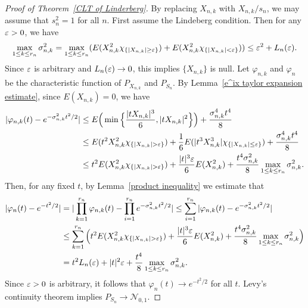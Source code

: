 \begin{proof}[Proof of Theorem~\ref{CLT of Linderberg}]
By replacing $X_{n,k}$ with $X_{n,k}/s_n$, we may assume that $s_n^2=1$ for all $n$. First assume the Lindeberg condition. Then for any $\varepsilon>0$, we have
\begin{equation*}
\begin{aligned}
\max_{1\leq k\leq r_n}\sigma_{n,k}^2=\max_{1\leq k\leq r_n}(E(X_{n,k}^2\chi_{\{|X_{n,k}|\geq\varepsilon\}})+E(X_{n,k}^2\chi_{\{|X_{n,k}|<\varepsilon\}}))\leq\varepsilon^2+L_n(\varepsilon).
\end{aligned}
\end{equation*}
Since $\varepsilon$ is arbitrary and $L_n(\varepsilon)\to 0$, this implies $\{X_{n,k}\}$ is null. Let $\varphi_{n,k}$ and $\varphi_n$ be the characteristic function of $P_{X_{n,k}}$ and $P_{S_n}$. By Lemma~\ref{e^ix taylor expansion estimate}, since $E(X_{n,k})=0$, we have
\begin{equation*}
\begin{aligned}
|\varphi_{n,k}(t)-e^{-\sigma_{n,k}^2t^2/2}|&\leq E\Big(\min\Big\{\frac{|tX_{n,k}|^3}{6},|tX_{n,k}|^2\Big\}\Big)+\frac{\sigma_{n,k}^4t^4}{8}\\
&\leq E(t^2X_{n,k}^2\chi_{\{|X_{n,k}|>\eps\}})+\frac{1}{6}E(|t^3X_{n,k}^3|\chi_{\{|X_{n,k}|\leq\eps\}})+\frac{\sigma_{n,k}^4t^4}{8}\\
&\leq t^2E(X_{n,k}^2\chi_{\{|X_{n,k}|>\eps\}})+\frac{|t|^3\eps}{6}E(X_{n,k}^2)+\frac{t^4\sigma_{n,k}^2}{8}\max_{1\leq k\leq r_n}\sigma_{n,k}^2.
\end{aligned}
\end{equation*}
Then, for any fixed $t$, by Lemma~\ref{product inequality} we estimate that
\begin{equation*}
\begin{aligned}
|\varphi_n(t)-e^{-t^2/2}|&=|\prod_{k=1}^{r_n}\varphi_{n,k}(t)-\prod_{i=1}^{r_n}e^{-\sigma_{n,k}^2t^2/2}|\leq\sum_{i=1}^{r_n}|\varphi_{n,k}(t)-e^{-\sigma_{n,k}^2t^2/2}|\\
&\leq \sum_{k=1}^{r_n}\Big(t^2E(X_{n,k}^2\chi_{\{|X_{n,k}|>\eps\}})+\frac{|t|^3\eps}{6}E(X_{n,k}^2)+\frac{t^4\sigma_{n,k}^2}{8}\max_{1\leq k\leq r_n}\sigma_{n,k}^2\Big)\\
&=t^2L_n(\eps)+|t|^2\eps+\frac{t^4}{8}\max_{1\leq k\leq r_n}\sigma_{n,k}^2.
\end{aligned}
\end{equation*}
Since $\varepsilon>0$ is arbitrary, it follows that $\varphi_n(t)\to e^{-t^2/2}$ for all $t$. Levy's continuity theorem implies $P_{S_n}\to \mathcal{N}_{0,1}$.
\end{proof}
